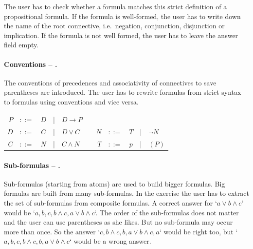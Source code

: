 The user has to check whether a formula matches this strict definition of 
a propositional formula.
If the formula is well-formed, the user has to write down the name of the root connective, 
i.e.\ negation, conjunction, disjunction or implication. 
If the formula is not well formed, the user has to leave the answer field empty.

\paragraph{Conventions – .}
\label{tut:22}
The conventions of precedences and associativity  of connectives to save parentheses are introduced. 
The user has to rewrite formulas from strict syntax to formulas using conventions and vice versa.

\begin{center}
\begin{tabular}{rccclp{1cm}rcccl}
$P$		&$::=$ & $D$ &|& $D \rightarrow P$ 	 \\
$D$		&$::=$ & $C$ &|& $D \vee C$		&& $N$		&$::=$ & $T$ &|& $\neg N$	\\
$C$		&$::=$ & $N$ &|& $C \wedge N$ 	&& $T$		&$::=$ & $p$ &|& $(P)$		\\
\end{tabular}
\end{center}


\paragraph{Sub-formulas – .}
\label{tut:23}
Sub-formulas (starting from atoms) are used to build bigger formulas. 
Big formulas are built from many sub-formulas.
In the exercise the user has to extract the set of sub-formulas from composite formulas. 
A correct answer for 
‘$a \vee b \wedge c$’ would be
‘$a,b,c,b\wedge c, a \vee b \wedge c$‘. 
The order of the sub-formulas does not matter and the user can use parentheses as she likes.
But no sub-formula may occur more than once. 
So the answer ‘$c, b\wedge c, b, a \vee b \wedge c, a$‘ would be right too, 
but ‘$a,b,c,b\wedge c, b, a \vee b \wedge c$‘ would be a wrong answer.

